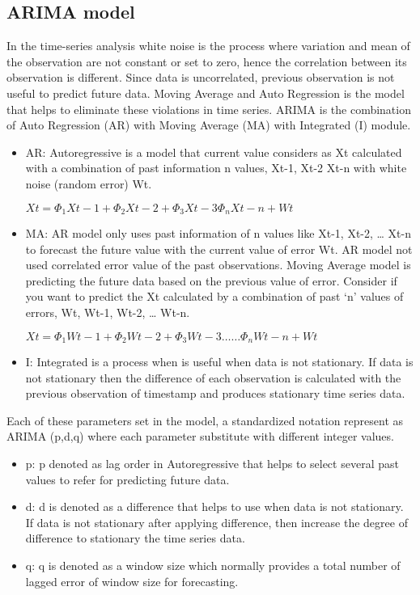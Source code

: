\subsection{ ARIMA model}
In the time-series analysis white noise is the process where variation and mean of the observation are not constant or set to zero, hence the correlation between its observation is different. Since data is uncorrelated, previous observation is not useful to predict future data. Moving Average and Auto Regression is the model that helps to eliminate these violations in time series.
ARIMA  is the combination of Auto Regression (AR) with Moving Average (MA) with Integrated (I) module.
\begin{itemize}
\item AR:  Autoregressive is a model that current value considers as Xt calculated with a combination of past information n  values, Xt-1, Xt-2 Xt-n with white noise  (random error) Wt.

\(Xt = \Phi_{1}Xt-1 + \Phi_{2}Xt-2 + \Phi_{3}Xt-3 \Phi_{n}Xt-n  + Wt                                          \) 	
\item MA: AR model only uses past information of n values like  Xt-1, Xt-2, … Xt-n to forecast the future value with the current value of error Wt. AR model not used correlated error value of the past observations. Moving Average model is predicting the future data based on the previous value of error. Consider if you want to predict the Xt calculated by a combination of past ‘n’ values of errors,  Wt, Wt-1, Wt-2, … Wt-n.

\(Xt = \Phi_{1}Wt-1 + \Phi_{2}Wt-2 + \Phi_{3}Wt-3 …… \Phi_{n}Wt-n  + Wt 	\)
\item I: Integrated is a process when is useful when data is not stationary. If data is not stationary then the difference of each observation is calculated with the previous observation of timestamp and produces stationary time series data.                                     
\end{itemize}
 	
Each of these parameters set in the model, a standardized notation represent as  ARIMA (p,d,q) where each parameter substitute with different integer values.
\begin{itemize}
\item p: p denoted as lag order in Autoregressive that helps to select several past values to refer for predicting future data.
\item d: d is denoted as a difference that helps to use when data is not stationary. If data is not stationary after applying difference, then increase the degree of difference to stationary the time series data.
\item q:  q is denoted as a window size which normally provides a total number of lagged error of window size for forecasting.
\end{itemize}

